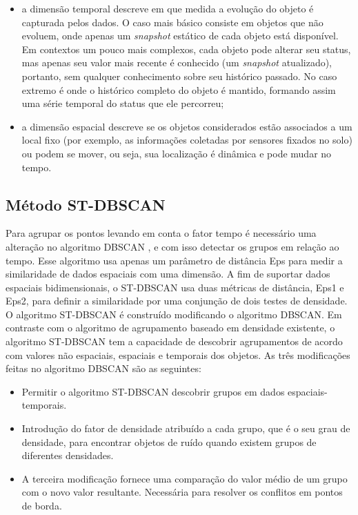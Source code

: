 \begin{itemize}
	\item a dimensão temporal descreve em que medida a evolução do objeto é capturada pelos dados. O caso mais básico consiste em objetos que não evoluem, onde apenas um \textit{snapshot} estático de cada objeto está disponível. Em contextos um pouco mais complexos, cada objeto pode alterar seu status, mas apenas seu valor mais recente é conhecido (um \textit{snapshot} atualizado), portanto, sem qualquer conhecimento sobre seu histórico passado. No caso extremo é onde o histórico completo do objeto é mantido, formando assim uma série temporal do status que ele percorreu;

	\item a dimensão espacial descreve se os objetos considerados estão associados a um local fixo (por exemplo, as informações coletadas por sensores fixados no solo) ou podem se mover, ou seja, sua localização é dinâmica e pode mudar no tempo.
\end{itemize}

\subsection{Método ST-DBSCAN}
\label{stdbscan}

Para agrupar os pontos levando em conta o fator tempo é necessário uma alteração no algoritmo \acrshort{DBSCAN} \cite{ESTER1998}, e com isso detectar os grupos em relação ao tempo. Esse algoritmo usa apenas um parâmetro de distância Eps para medir a similaridade de dados espaciais com uma dimensão. A fim de suportar dados espaciais bidimensionais, o \acrshort{ST-DBSCAN} \cite{Birant2007STDBSCANAA} usa duas métricas de distância, Eps1 e Eps2, para definir a similaridade por uma conjunção de dois testes de densidade.
O algoritmo \acrshort{ST-DBSCAN} é construído modificando o algoritmo \acrshort{DBSCAN}. Em contraste com o algoritmo de agrupamento baseado em densidade existente, o algoritmo \acrshort{ST-DBSCAN} tem a capacidade de descobrir agrupamentos de acordo com valores não espaciais, espaciais e temporais dos objetos. As três modificações feitas no algoritmo \acrshort{DBSCAN} são as seguintes:
\begin{itemize}
\item Permitir o algoritmo \acrshort{ST-DBSCAN} descobrir grupos em dados espaciais-temporais.
\item Introdução do fator de densidade atribuído a cada grupo, que é o seu grau de densidade, para encontrar objetos de ruído quando existem grupos de diferentes densidades.
\item A terceira modificação fornece uma comparação do valor médio de um grupo com o novo valor resultante. Necessária para resolver os conflitos em pontos de borda.
\end{itemize}

